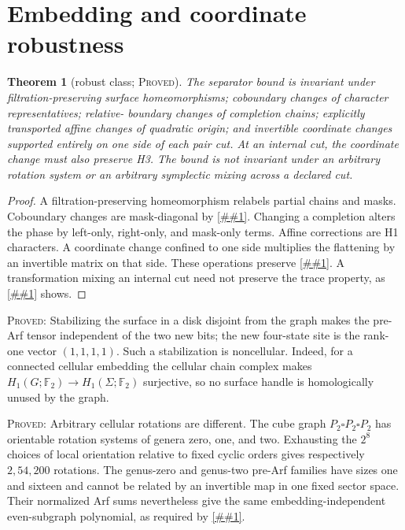\documentclass[11pt]{article}
\newcommand{\cref}[1]{\autoref{##1}}%
\newtheorem{theorem}{Theorem}[section]
\newcommand{\Ftwo}{\mathbb F_2}
\newcommand{\claimtag}[1]{\textsc{#1}}
\newcommand{\proved}{\claimtag{Proved}}
\begin{document}
\section{Embedding and coordinate robustness}

\begin{theorem}[robust class; \proved]\label{thm:robust}
The separator bound is invariant under filtration-preserving surface
homeomorphisms; coboundary changes of character representatives; relative-
boundary changes of completion chains; explicitly transported affine changes
of quadratic origin; and invertible coordinate changes supported entirely on
one side of each pair cut.  At an internal cut, the coordinate change must
also preserve H3.  The bound is not invariant under an arbitrary rotation
system or an arbitrary symplectic mixing across a declared cut.
\end{theorem}

\begin{proof}
A filtration-preserving homeomorphism relabels partial chains and masks.
Coboundary changes are mask-diagonal by \cref{eq:stokes}.  Changing a
completion alters the phase by left-only, right-only, and mask-only terms.
Affine corrections are H1 characters.  A coordinate change confined to one
side multiplies the flattening by an invertible matrix on that side.  These
operations preserve \cref{eq:XY}.  A transformation mixing an internal cut
need not preserve the trace property, as \cref{thm:k33} shows.
\end{proof}

\proved: Stabilizing the surface in a disk disjoint from the graph makes the pre-Arf
tensor independent of the two new bits; the new four-state site is the
rank-one vector \((1,1,1,1)\).  Such a stabilization is noncellular.  Indeed,
for a connected cellular embedding the cellular chain complex makes
\(H_1(G;\Ftwo)\to H_1(\Sigma;\Ftwo)\) surjective, so no surface handle is
homologically unused by the graph.

\proved: Arbitrary cellular rotations are different.  The cube graph
\(P_2\square P_2\square P_2\) has orientable rotation systems of genera zero,
one, and two.  Exhausting the \(2^8\) choices of local orientation relative to
fixed cyclic orders gives respectively \(2,54,200\) rotations.  The genus-zero
and genus-two pre-Arf families have sizes one and sixteen and cannot be
related by an invertible map in one fixed sector space.  Their normalized Arf
sums nevertheless give the same embedding-independent even-subgraph
polynomial, as required by \cref{eq:arf}.
\end{document}
